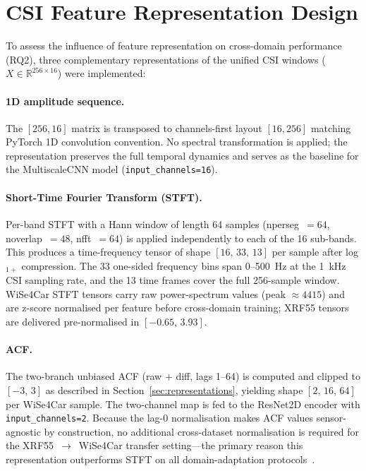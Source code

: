 \documentclass[english,bibtex]{kththesis}
\begin{document}
\section{CSI Feature Representation Design}
\label{sec:reprdesign}

To assess the influence of feature representation on cross-domain performance (RQ2), three complementary representations of the unified CSI windows ($X \in \mathbb{R}^{256 \times 16}$) were implemented:

\paragraph{1D amplitude sequence.} The $[256, 16]$ matrix is transposed to channels-first layout $[16, 256]$ matching PyTorch 1D convolution convention. No spectral transformation is applied; the representation preserves the full temporal dynamics and serves as the baseline for the MultiscaleCNN model (\texttt{input\_channels=16}).

\paragraph{Short-Time Fourier Transform (STFT).} Per-band STFT with a Hann window of length 64 samples (nperseg~$= 64$, noverlap~$= 48$, nfft~$= 64$) is applied independently to each of the 16 sub-bands. This produces a time-frequency tensor of shape $[16,\,33,\,13]$ per sample after log$_{1+}$ compression. The 33 one-sided frequency bins span 0--500~Hz at the 1~kHz CSI sampling rate, and the 13 time frames cover the full 256-sample window. WiSe4Car STFT tensors carry raw power-spectrum values (peak $\approx 4415$) and are z-score normalised per feature before cross-domain training; XRF55 tensors are delivered pre-normalised in $[-0.65,\, 3.93]$.

\paragraph{ACF.} The two-branch unbiased ACF (raw + diff, lags 1--64) is computed and clipped to $[-3,\,3]$ as described in Section~\ref{sec:representations}, yielding shape $[2,\,16,\,64]$ per WiSe4Car sample. The two-channel map is fed to the ResNet2D encoder with \texttt{input\_channels=2}. Because the lag-0 normalisation makes ACF values sensor-agnostic by construction, no additional cross-dataset normalisation is required for the XRF55~$\to$~WiSe4Car transfer setting---the primary reason this representation outperforms STFT on all domain-adaptation protocols~\cite{jayaweera2025deepcpd}.
\end{document}
